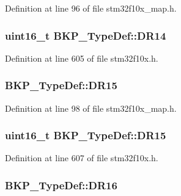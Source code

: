 Definition at line 96 of file stm32f10x\+\_\+map.\+h.

\subsubsection[{\texorpdfstring{D\+R14}{DR14}}]{ {\bf uint16\+\_\+t} B\+K\+P\+\_\+\+Type\+Def\+::\+D\+R14}\hypertarget{struct_b_k_p___type_def_aa925753417b767820db2ff1fa87d0c86}{}\label{struct_b_k_p___type_def_aa925753417b767820db2ff1fa87d0c86}


Definition at line 605 of file stm32f10x.\+h.

\subsubsection[{\texorpdfstring{D\+R15}{DR15}}]{ B\+K\+P\+\_\+\+Type\+Def\+::\+D\+R15}\hypertarget{struct_b_k_p___type_def_a36c829ae704bbe9be0337c9362ecdc80}{}\label{struct_b_k_p___type_def_a36c829ae704bbe9be0337c9362ecdc80}


Definition at line 98 of file stm32f10x\+\_\+map.\+h.

\subsubsection[{\texorpdfstring{D\+R15}{DR15}}]{ {\bf uint16\+\_\+t} B\+K\+P\+\_\+\+Type\+Def\+::\+D\+R15}\hypertarget{struct_b_k_p___type_def_accafac1f65c5eb8f63d5a98ee8173ab3}{}\label{struct_b_k_p___type_def_accafac1f65c5eb8f63d5a98ee8173ab3}


Definition at line 607 of file stm32f10x.\+h.

\subsubsection[{\texorpdfstring{D\+R16}{DR16}}]{ B\+K\+P\+\_\+\+Type\+Def\+::\+D\+R16}\hypertarget{struct_b_k_p___type_def_adc6924ac35e5a438ff0600e04c55ce2f}{}\label{struct_b_k_p___type_def_adc6924ac35e5a438ff0600e04c55ce2f}


